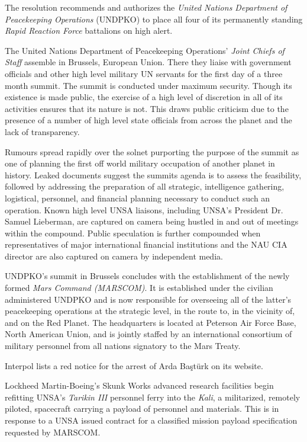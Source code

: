 The resolution recommends and authorizes the {\it United Nations Department of Peacekeeping Operations} (UNDPKO) to place all four of its permanently standing {\it Rapid Reaction Force} battalions on high alert.
\StopTimelineDate

The United Nations Department of Peacekeeping Operations' {\it Joint Chiefs of Staff} assemble in Brussels, European Union. There they liaise with government officials and other high level military UN servants for the first day of a three month summit. The summit is conducted under maximum security. Though its existence is made public, the exercise of a high level of discretion in all of its activities ensures that its nature is not. This draws public criticism due to the presence of a number of high level state officials from across the planet and the lack of transparency.

Rumours spread rapidly over the solnet purporting the purpose of the summit as one of planning the first off world military occupation of another planet in history. Leaked documents suggest the summits agenda is to assess the feasibility, followed by addressing the preparation of all strategic, intelligence gathering, logistical, personnel, and financial planning necessary to conduct such an operation. Known high level UNSA liaisons, including UNSA's President Dr. Samuel Lieberman, are captured on camera being hustled in and out of meetings within the compound. Public speculation is further compounded when representatives of major international financial institutions and the NAU CIA director are also captured on camera by independent media.
\StopTimelineDate

UNDPKO's summit in Brussels concludes with the establishment of the newly formed {\it Mars Command (MARSCOM)}. It is established under the civilian administered UNDPKO and is now responsible for overseeing all of the latter's peacekeeping operations at the strategic level, in the route to, in the vicinity of, and on the Red Planet. The headquarters is located at Peterson Air Force Base, North American Union, and is jointly staffed by an international consortium of military personnel from all nations signatory to the Mars Treaty.
\StopTimelineDate

Interpol lists a red notice for the arrest of Arda Baştürk on its website.
\StopTimelineDate

Lockheed Martin-Boeing's Skunk Works advanced research facilities begin refitting UNSA's {\it Tarikin III} personnel ferry into the {\it Kali}, a militarized, remotely piloted, spacecraft carrying a payload of personnel and materials. This is in response to a UNSA issued contract for a classified mission payload specification requested by MARSCOM.
\StopTimelineDate

